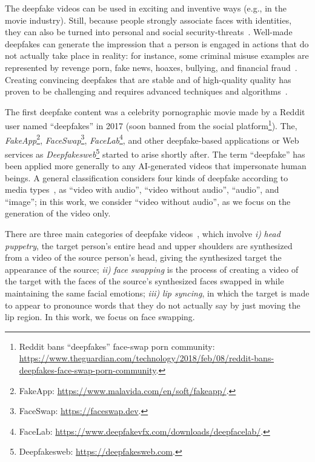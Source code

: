 \documentclass[preprint]{elsarticle}
\begin{document}
The deepfake videos can be used in exciting and inventive ways (e.g., in the movie industry). Still, because people strongly associate faces with  identities, they can also be turned into personal and social security-threats~\cite{securitythreat}. Well-made deepfakes  can generate the impression that a person is  engaged in actions that do not actually take place in reality: for instance, some criminal misuse examples are represented by revenge porn, fake news, hoaxes, bullying, and financial fraud~\cite{financialfraud}.
Creating convincing deepfakes that are stable and of high-quality quality has proven  to be challenging and requires advanced techniques and algorithms~\cite{survey2}. 

The first deepfake content was a celebrity pornographic movie made by a Reddit user named ``deepfakes'' in 2017 (soon banned from the social platform\footnote{Reddit bans ``deepfakes'' face-swap porn community: \url{https://www.theguardian.com/technology/2018/feb/08/reddit-bans-deepfakes-face-swap-porn-community}.}). The, \emph{FakeApp}\footnote{FakeApp: \url{https://www.malavida.com/en/soft/fakeapp/}.}, \emph{FaceSwap}\footnote{FaceSwap: \url{https://faceswap.dev}.}, \emph{FaceLab}\footnote{FaceLab: \url{https://www.deepfakevfx.com/downloads/deepfacelab/}.}, and other deepfake-based applications or Web services as \emph{Deepfakesweb}\footnote{Deepfakesweb: \url{https://deepfakesweb.com}.} started to arise shortly after. 
The term ``deepfake'' has been applied more generally to any AI-generated videos that impersonate human beings.
A general classification considers  four kinds of deepfake according to media types~\cite{surveydet}, as ``video with audio'', ``video without audio'', ``audio'', and ``image''; in this work, we consider ``video without audio'', as we focus on the generation of the video only.

There are three main categories of deepfake videos~\cite{lyu}, which involve \emph{i)} \emph{head puppetry}, the target person's entire head and upper shoulders are synthesized from a video of the source person's head, giving the synthesized target the appearance of the source; \emph{ii)} \emph{face swapping} is the process of creating a video of the target with the faces of the source's synthesized faces swapped in while maintaining the same facial emotions; \emph{iii)} \emph{lip syncing}, in which the target is made to appear to pronounce words that they do not actually say by just moving the lip region. In this work, we focus on face swapping.
\end{document}
